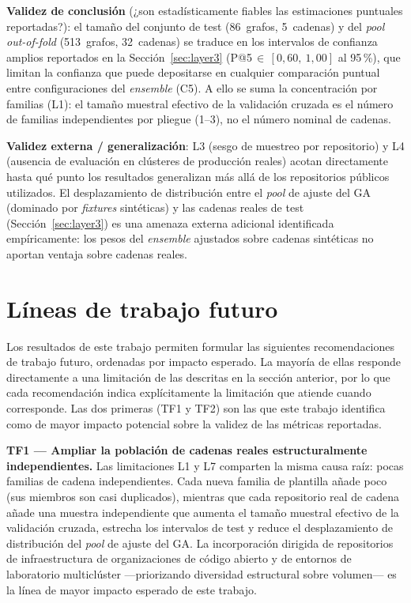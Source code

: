\textbf{Validez de conclusión} (¿son estadísticamente fiables las estimaciones
puntuales reportadas?): el tamaño del conjunto de test (86~grafos, 5~cadenas) y
del \textit{pool out-of-fold} (513~grafos, 32~cadenas) se traduce en los
intervalos de confianza amplios reportados en la Sección~\ref{sec:layer3}
(P@5\,\(\in\,[0{,}60,\ 1{,}00]\) al 95\,\%), que limitan la confianza que puede
depositarse en cualquier comparación puntual entre configuraciones del
\textit{ensemble} (C5). A ello se suma la concentración por familias (L1): el
tamaño muestral efectivo de la validación cruzada es el número de familias
independientes por pliegue (1--3), no el número nominal de cadenas.

\textbf{Validez externa / generalización}: L3 (sesgo de muestreo por
repositorio) y L4 (ausencia de evaluación en clústeres de producción reales)
acotan directamente hasta qué punto los resultados generalizan más allá de los
repositorios públicos utilizados. El desplazamiento de distribución entre el
\textit{pool} de ajuste del \ac{GA} (dominado por \textit{fixtures} sintéticas)
y las cadenas reales de test (Sección~\ref{sec:layer3}) es una amenaza externa
adicional identificada empíricamente: los pesos del \textit{ensemble} ajustados
sobre cadenas sintéticas no aportan ventaja sobre cadenas reales.

\section{Líneas de trabajo futuro}

Los resultados de este trabajo permiten formular las siguientes recomendaciones de
trabajo futuro, ordenadas por impacto esperado. La mayoría de ellas responde
directamente a una limitación de las descritas en la sección anterior, por lo
que cada recomendación indica explícitamente la limitación que atiende cuando
corresponde. Las dos primeras (TF1 y TF2) son las que este trabajo identifica
como de mayor impacto potencial sobre la validez de las métricas reportadas.

\textbf{TF1 — Ampliar la población de cadenas reales estructuralmente
independientes.} Las limitaciones L1 y L7 comparten la misma causa raíz: pocas
familias de cadena independientes. Cada nueva familia de plantilla añade poco
(sus miembros son casi duplicados), mientras que cada repositorio real de cadena
añade una muestra independiente que aumenta el tamaño muestral efectivo de la
validación cruzada, estrecha los intervalos de test y reduce el desplazamiento de
distribución del \textit{pool} de ajuste del \ac{GA}. La incorporación dirigida
de repositorios de infraestructura de organizaciones de código abierto y de
entornos de laboratorio multiclúster —priorizando diversidad estructural sobre
volumen— es la línea de mayor impacto esperado de este trabajo.

